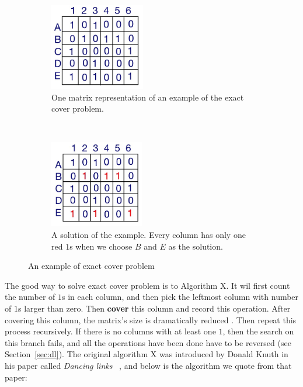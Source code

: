 \begin{figure}[ht]
  \centering
  \begin{subfigure}[t]{0.5\textwidth}
    \includegraphics[height=1.5in]{figure/ecp_1.JPG}
    \caption{One matrix representation of an example of the exact cover problem.}
    \label{fig:ecp_1}
  \end{subfigure}%
  ~  
  \begin{subfigure}[t]{0.5\textwidth}
    \includegraphics[height=1.5in]{figure/ecp_2.JPG}
    \caption{A solution of the example. Every column has only one red $1$s when we choose $B$ and $E$ as the solution. }
    \label{fig:ecp_2}
  \end{subfigure}%
  \caption{An example of exact cover problem}
  \label{fig:ecp}
\end{figure}

The good way to solve exact cover problem  is to Algorithm X. It wil first count the number of $1$s in each column, and then pick the leftmost column with number of $1$s larger than zero. Then \textbf{cover} this column and record this operation. After covering this column, the matrix's size is dramatically reduced . Then repeat this process recursively. If there is no columns with at least one $1$, then the search on this branch fails, and all the operations have been done have to be reversed (see Section~\ref{sec:dl}). The original algorithm X was introduced by Donald Knuth in his paper called \textit{Dancing links} ~\cite{knuth_dancing_2000}, and below is the algorithm we quote from that paper:

